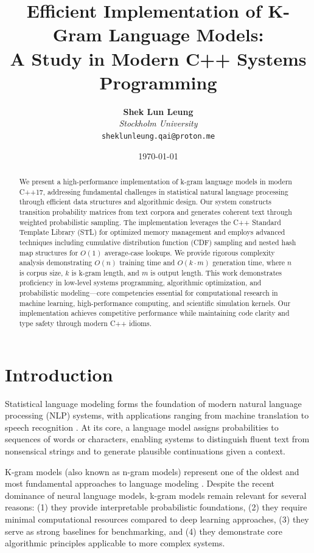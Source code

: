 \documentclass[11pt,letterpaper]{article}
\title{\textbf{Efficient Implementation of K-Gram Language Models:\\A Study in Modern C++ Systems Programming}}
\author{
    \textbf{Shek Lun Leung}\\
    \textit{Stockholm University}\\
    \texttt{sheklunleung.qai@proton.me}
}
\date{\today}
\begin{document}
\maketitle

\begin{abstract}
We present a high-performance implementation of k-gram language models in modern C++17, addressing fundamental challenges in statistical natural language processing through efficient data structures and algorithmic design. Our system constructs transition probability matrices from text corpora and generates coherent text through weighted probabilistic sampling. The implementation leverages the C++ Standard Template Library (STL) for optimized memory management and employs advanced techniques including cumulative distribution function (CDF) sampling and nested hash map structures for $O(1)$ average-case lookups. We provide rigorous complexity analysis demonstrating $O(n)$ training time and $O(k \cdot m)$ generation time, where $n$ is corpus size, $k$ is k-gram length, and $m$ is output length. This work demonstrates proficiency in low-level systems programming, algorithmic optimization, and probabilistic modeling—core competencies essential for computational research in machine learning, high-performance computing, and scientific simulation kernels. Our implementation achieves competitive performance while maintaining code clarity and type safety through modern C++ idioms.
\end{abstract}

\section{Introduction}

Statistical language modeling forms the foundation of modern natural language processing (NLP) systems, with applications ranging from machine translation to speech recognition \cite{jurafsky2009speech}. At its core, a language model assigns probabilities to sequences of words or characters, enabling systems to distinguish fluent text from nonsensical strings and to generate plausible continuations given a context.

K-gram models (also known as n-gram models) represent one of the oldest and most fundamental approaches to language modeling \cite{shannon1948mathematical}. Despite the recent dominance of neural language models, k-gram models remain relevant for several reasons: (1) they provide interpretable probabilistic foundations, (2) they require minimal computational resources compared to deep learning approaches, (3) they serve as strong baselines for benchmarking, and (4) they demonstrate core algorithmic principles applicable to more complex systems.
\end{document}

